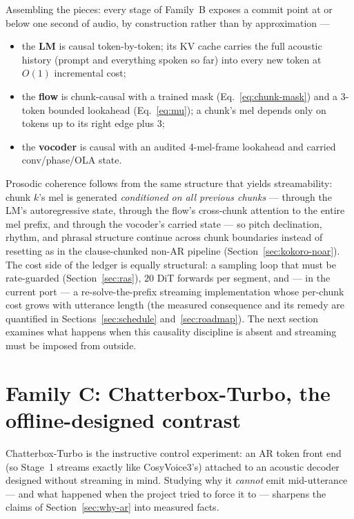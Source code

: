 \documentclass[11pt,a4paper]{article}
\begin{document}
Assembling the pieces: every stage of Family~B exposes a commit point at or below one
second of audio, by construction rather than by approximation ---
\begin{itemize}[leftmargin=2em]
\item the \textbf{LM} is causal token-by-token; its KV cache carries the full acoustic
history (prompt and everything spoken so far) into every new token at $O(1)$
incremental cost;
\item the \textbf{flow} is chunk-causal with a trained mask
(Eq.~\ref{eq:chunk-mask}) and a 3-token bounded lookahead (Eq.~\ref{eq:mu}); a chunk's
mel depends only on tokens up to its right edge plus 3;
\item the \textbf{vocoder} is causal with an audited 4-mel-frame lookahead and carried
conv/phase/OLA state.
\end{itemize}
Prosodic coherence follows from the same structure that yields streamability: chunk
$k$'s mel is generated \emph{conditioned on all previous chunks} --- through the LM's
autoregressive state, through the flow's cross-chunk attention to the entire mel
prefix, and through the vocoder's carried state --- so pitch declination, rhythm, and
phrasal structure continue across chunk boundaries instead of resetting as in the
clause-chunked non-AR pipeline (Section~\ref{sec:kokoro-noar}). The cost side of the
ledger is equally structural: a sampling loop that must be rate-guarded
(Section~\ref{sec:ras}), $20$ DiT forwards per segment, and --- in the current port ---
a re-solve-the-prefix streaming implementation whose per-chunk cost grows with utterance
length (the measured consequence and its remedy are quantified in
Sections~\ref{sec:schedule} and~\ref{sec:roadmap}). The next section examines what
happens when this causality discipline is absent and streaming must be imposed from
outside.

\section{Family C: Chatterbox-Turbo, the offline-designed contrast}
\label{sec:chatterbox}

Chatterbox-Turbo is the instructive control experiment: an AR token front end
(so Stage~1 streams exactly like CosyVoice3's) attached to an acoustic decoder designed
without streaming in mind. Studying why it \emph{cannot} emit mid-utterance --- and what
happened when the project tried to force it to --- sharpens the claims of
Section~\ref{sec:why-ar} into measured facts.
\end{document}
